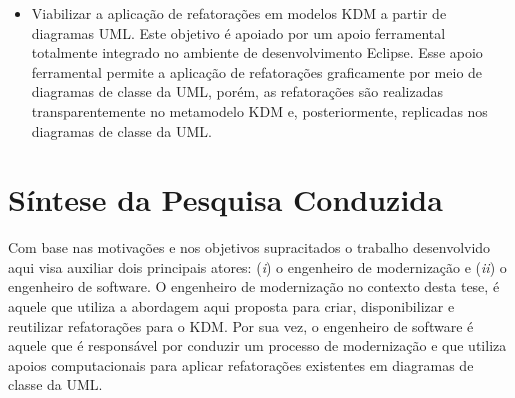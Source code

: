 \begin{itemize}
	
    
    \item Viabilizar a aplicação de refatorações em modelos KDM a partir de diagramas UML. Este objetivo é apoiado por um apoio ferramental totalmente integrado no ambiente de desenvolvimento Eclipse. Esse apoio ferramental permite a aplicação de refatorações graficamente por meio de diagramas de classe da UML, porém, as refatorações são realizadas transparentemente no metamodelo KDM e, posteriormente, replicadas nos diagramas de classe da UML. 
    	

\end{itemize}

\section{Síntese da Pesquisa Conduzida}\label{sec:introducao:a_abordagem_desenvolvida}

Com base nas motivações e nos objetivos supracitados o trabalho desenvolvido aqui visa auxiliar dois principais atores: (\textit{i}) o engenheiro de modernização e (\textit{ii}) o engenheiro de software. O engenheiro de modernização no contexto desta tese, é aquele que utiliza a abordagem aqui proposta para criar, disponibilizar e reutilizar refatorações para o KDM. Por sua vez, o engenheiro de software é aquele que é responsável por conduzir um processo de modernização e que utiliza apoios computacionais para aplicar refatorações existentes em diagramas de classe da UML.





